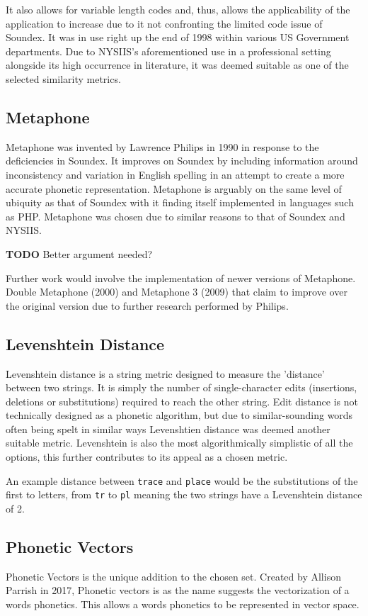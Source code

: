 It also allows for variable length codes and, thus, allows the applicability of the application to increase due to it not confronting the limited code issue of Soundex. It was in use right up the end of 1998 within various US Government departments. Due to NYSIIS's aforementioned use in a professional setting alongside its high occurrence in literature, it was deemed suitable as one of the selected similarity metrics.

\subsection{Metaphone}
Metaphone was invented by Lawrence Philips in 1990\cite{philips1990hanging} in response to the deficiencies in Soundex. It improves on Soundex by including information around inconsistency and variation in English spelling in an attempt to create a more accurate phonetic representation. Metaphone is arguably on the same level of ubiquity as that of Soundex with it finding itself implemented in languages such as PHP\cite{php}. Metaphone was chosen due to similar reasons to that of Soundex and NYSIIS. 

\textbf{TODO} Better argument needed?

Further work would involve the implementation of newer versions of Metaphone. Double Metaphone (2000) and Metaphone 3 (2009) that claim to improve over the original version due to further research performed by Philips. 

\subsection{Levenshtein Distance}
Levenshtein distance is a string metric designed to measure the 'distance' between two strings. It is simply the number of single-character edits (insertions, deletions or substitutions) required to reach the other string. Edit distance is not technically designed as a phonetic algorithm, but due to similar-sounding words often being spelt in similar ways\cite{hettiarachchi2012sparcl} Levenshtien distance was deemed another suitable metric. Levenshtein is also the most algorithmically simplistic of all the options, this further contributes to its appeal as a chosen metric.

An example distance between \verb|trace| and \verb|place| would be the substitutions of the first to letters, from \verb|tr| to \verb|pl| meaning the two strings have a Levenshtein distance of 2.

\subsection{Phonetic Vectors}
Phonetic Vectors is the unique addition to the chosen set. Created by Allison Parrish in 2017\cite{parrish2017poetic}, Phonetic vectors is as the name suggests the vectorization of a words phonetics. This allows a words phonetics to be represented in vector space.

